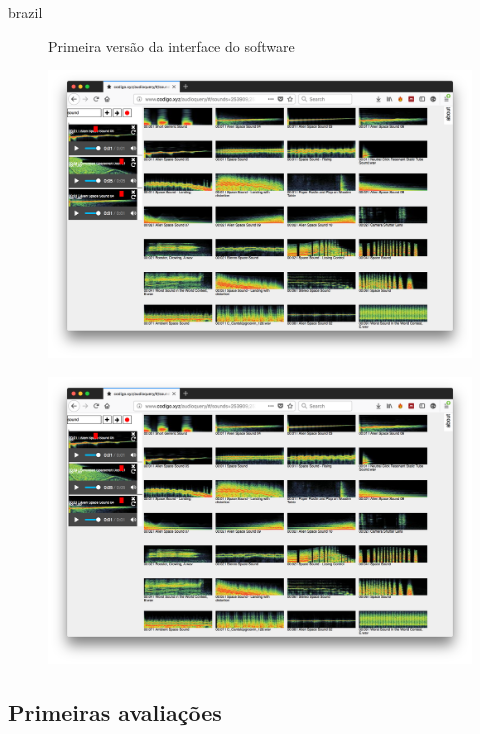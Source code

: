 \begin{otherlanguage*}{brazil}
\begin{figure}[htb]
\label{audiqueryminipage}
\centering
 \begin{minipage}{0.49\textwidth}
   \centering
   \caption{Primeira versão da interface do software} \label{fig_minipage_imagem1}
   \includegraphics[width=\textwidth]{pictures/cap4/audioquery_firefox}
 \end{minipage}
 \hfill
 \begin{minipage}{0.49\textwidth}
   \centering
   \caption{} \label{fig_minipage_grafico2}
   \includegraphics[width=\textwidth]{pictures/cap4/audioquery_firefox}
 \end{minipage}
\end{figure}


\subsection{Primeiras avaliações}




\end{otherlanguage*}
